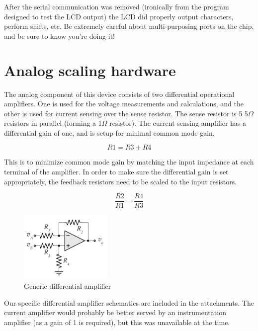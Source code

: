 After the serial communication was removed (ironically from the program designed to test the LCD output) the LCD did properly output characters, perform shifts, etc. Be extremely careful about multi-purposing ports on the chip, and be sure to know you're doing it!
\clearpage
\section{Analog scaling hardware}

The analog component of this device consists of two differential operational amplifiers. One is used for the voltage measurements and calculations, and the other is used for current sensing over the sense resistor. The sense resistor is 5 5$\Omega$ resistors in parallel (forming a 1$\Omega$ resistor). The current sensing amplifier has a differential gain of one, and is setup for minimal common mode gain.

\begin{equation}
\label{3:eq:Acm}
	R1 = R3+R4
\end{equation}

This is to minimize common mode gain by matching the input impedance at each terminal of the amplifier. In order to make sure the differential gain is set appropriately, the feedback resistors need to be scaled to the input resistors.

\begin{equation}
\label{3:eq:Ad}
	\frac{R2}{R1} = \frac{R4}{R3}
\end{equation}

\begin{figure}[h]
	\centering
	\includegraphics[width=0.40\textwidth]{genericdiffamp}	
	\caption{Generic differential amplifier}
	\label{3:fig:gdamp}
\end{figure}

Our specific differential amplifier schematics are included in the attachments. The current amplifier would probably be better served by an instrumentation amplifier (as a gain of 1 is required), but this was unavailable at the time.

